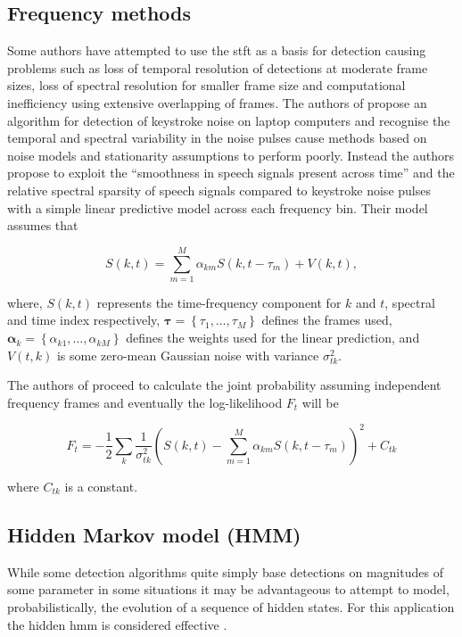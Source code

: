 \subsection{Frequency methods}
 Some authors have attempted to use the \gls{stft} as a basis for detection \cite{Czyzewski1995}\cite{Subramanya2007}\cite{Sugiyama2007}\cite{Abramson2007} causing problems such as loss of temporal resolution of detections at moderate frame sizes, loss of spectral resolution for smaller frame size and computational inefficiency using extensive overlapping of frames. The authors of \cite{Subramanya2007} propose an algorithm for detection of keystroke noise on laptop computers and recognise the temporal and spectral variability in the noise pulses cause methods based on noise models and stationarity assumptions to perform poorly. Instead the authors propose to exploit the ``smoothness in speech signals present across time'' and the relative spectral sparsity of speech signals compared to keystroke noise pulses with a simple linear predictive model across each frequency bin. Their model assumes that

\begin{equation}
\label{eq:Subramanya2007}
S(k,t) = \sum_{m=1}^M \alpha_{km} S(k,t - \tau_m) + V(k,t),
\end{equation}

where, $S(k,t)$ represents the time-frequency component for $k$ and $t$, spectral and time index respectively, $\boldsymbol{\tau} = \left\{\tau_1, \ldots ,\tau_M \right\}$ defines the frames used, \linebreak[2]$\boldsymbol{\alpha}_k = \left\{\alpha_{k1},\ldots,\alpha_{kM} \right\}$ defines the weights used for the linear prediction, and $V(t,k)$ is some zero-mean Gaussian noise with variance $\sigma^2_{tk}$.

The authors of \cite{Subramanya2007} proceed to calculate the joint probability assuming independent frequency frames and eventually the log-likelihood $F_t$ will be

\begin{equation}
\label{eq:Subramanya2007_2}
F_t = - \frac{1}{2} \sum_k \frac{1}{\sigma^2_{tk}} \left( S\left(k,t\right) - \sum_{m=1}^M \alpha_{km} S(k,t-\tau_m)\right)^2 + C_{tk}
\end{equation}

where $C_{tk}$ is a constant.

\subsection{Hidden Markov model (HMM)}
While some detection algorithms quite simply base detections on magnitudes of some parameter \cite{Subramanya2007}\cite{Sugiyama2007} in some situations it may be advantageous to attempt to model, probabilistically, the evolution of a sequence of hidden states. For this application the hidden \gls{hmm} is considered effective \cite{Rabiner1989}\cite{Xu2005}.

